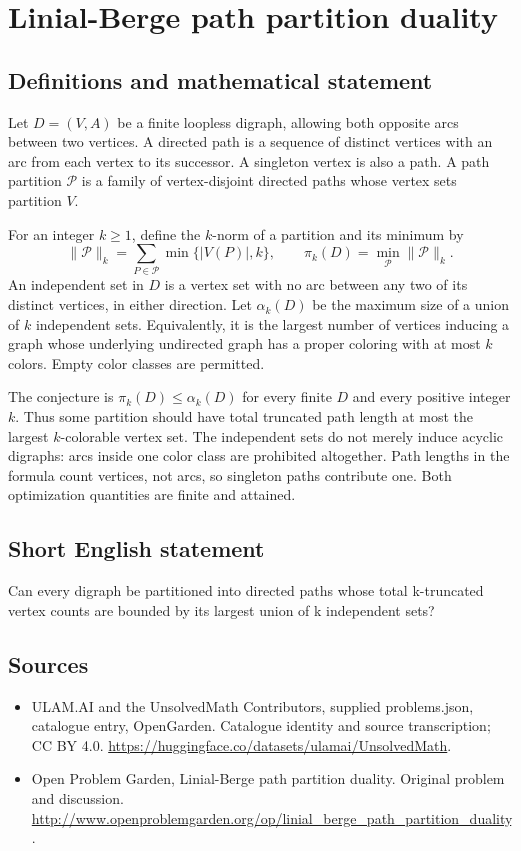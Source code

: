 \documentclass[11pt,a4paper]{article}
\begin{document}
\section*{Linial-Berge path partition duality}\label{statement}

\subsection{Definitions and mathematical statement}
Let $D=(V,A)$ be a finite loopless digraph, allowing both opposite arcs between two vertices. A directed path is a sequence of distinct vertices with an arc from each vertex to its successor. A singleton vertex is also a path. A path partition $\mathcal P$ is a family of vertex-disjoint directed paths whose vertex sets partition $V$.

For an integer $k\ge1$, define the $k$-norm of a partition and its minimum by
\[
 \|\mathcal P\|_k=\sum_{P\in\mathcal P}\min\{|V(P)|,k\},
 \qquad \pi_k(D)=\min_{\mathcal P}\|\mathcal P\|_k.
\]
An independent set in $D$ is a vertex set with no arc between any two of its distinct vertices, in either direction. Let $\alpha_k(D)$ be the maximum size of a union of $k$ independent sets. Equivalently, it is the largest number of vertices inducing a graph whose underlying undirected graph has a proper coloring with at most $k$ colors. Empty color classes are permitted.

The conjecture is $\pi_k(D)\le\alpha_k(D)$ for every finite $D$ and every positive integer $k$. Thus some partition should have total truncated path length at most the largest $k$-colorable vertex set. The independent sets do not merely induce acyclic digraphs: arcs inside one color class are prohibited altogether. Path lengths in the formula count vertices, not arcs, so singleton paths contribute one. Both optimization quantities are finite and attained.
\subsection{Short English statement}
Can every digraph be partitioned into directed paths whose total k-truncated vertex counts are bounded by its largest union of k independent sets?
\subsection{Sources}
\begin{itemize}
\item[S1] ULAM.AI and the UnsolvedMath Contributors, supplied problems.json, catalogue entry, OpenGarden. Catalogue identity and source transcription; CC BY 4.0.
\url{https://huggingface.co/datasets/ulamai/UnsolvedMath}.
\item[S2] Open Problem Garden, Linial-Berge path partition duality. Original problem and discussion.
\url{http://www.openproblemgarden.org/op/linial_berge_path_partition_duality}.
\end{itemize}
\end{document}
